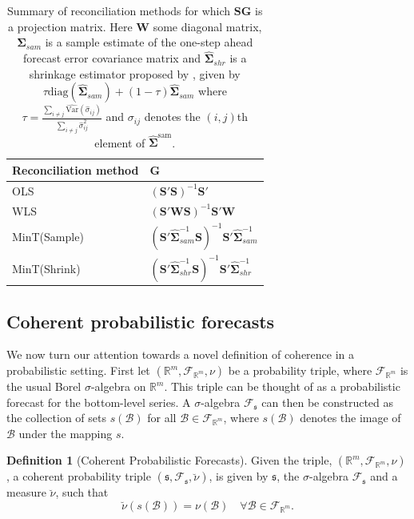 \documentclass[12pt]{article}
\def\var{\text{Var}}
\theoremstyle{definition}
\newtheorem{definition}{Definition}[section]
\begin{document}
\begin{table}[!t]
	\caption{Summary of reconciliation methods for which $\bm{S}\bm{G}$ is a projection matrix. Here $\bm{W}$ some diagonal matrix, $\bm{\hat\Sigma}_{sam}$ is a sample estimate of the one-step ahead forecast error covariance matrix and $\bm{\hat\Sigma}_{shr}$ is a shrinkage estimator proposed by \citet{Schafer2005}, given by $\tau \textrm{diag}(\bm{\hat\Sigma}_{sam})+(1-\tau)\bm{\hat\Sigma}_{sam}$  where $\tau = \frac{\sum_{i \neq j}\hat{\var}(\hat{\sigma}_{ij})}{\sum_{i \neq j}{\hat{\sigma}}^2_{ij}}$ and  $\sigma_{ij}$ denotes the $(i,j)$th element of $\hat{\bm{\Sigma}}^{\text{sam}}$.} \label{tab:ReconMethods}
	\centering
	\begin{tabular}{l@{\hskip 0.4in}l}
		\toprule
		\textbf{Reconciliation method} & \textbf{$\bm{G}$} \\
		\midrule
		OLS             & $(\bm{S}'\bm{S})^{-1}\bm{S}'$ \\
		WLS             & $(\bm{S}'\bm{W}\bm{S})^{-1}\bm{S}'\bm{W}$ \\
		MinT(Sample)    & $(\bm{S}'\bm{\hat\Sigma}_{sam}^{-1}\bm{S})^{-1}\bm{S}' \bm{\hat\Sigma}_{sam}^{-1}$  \\
		MinT(Shrink)    & $(\bm{S}'\bm{\hat\Sigma}_{shr}^{-1}\bm{S})^{-1}\bm{S}' \bm{\hat\Sigma}_{shr}^{-1}$  \\
		\bottomrule
	\end{tabular}
	\label{tab:recomethods}
\end{table}

\subsection{Coherent probabilistic forecasts}

We now turn our attention towards a novel definition of coherence in a probabilistic setting.  First let $(\mathbb{R}^m, \mathscr{F}_{\mathbb{R}^m}, \nu)$ be a probability triple, where $\mathscr{F}_{\mathbb{R}^m}$ is the usual Borel $\sigma$-algebra on $\mathbb{R}^m$. This triple can be thought of as a probabilistic forecast for the bottom-level series.  A $\sigma$-algebra $\mathscr{F}_{\mathfrak{s}}$ can then be constructed as the collection of sets $s(\mathcal{B})$ for all $\mathcal{B}\in \mathscr{F}_{\mathbb{R}^m}$, where $s(\mathcal{B})$ denotes the image of $\mathcal{B}$ under the mapping $s$.

\begin{definition}[Coherent Probabilistic Forecasts]\label{def:cohprob}
	Given the triple, $(\mathbb{R}^m, \mathscr{F}_{\mathbb{R}^m}, \nu)$, a coherent probability triple $(\mathfrak{s}, \mathscr{F}_{\mathfrak{s}}, \breve{\nu})$, is given by $\mathfrak{s}$, the $\sigma$-algebra $\mathscr{F}_{\mathfrak{s}}$ and a measure $\breve{\nu}$, such that
	\[
	\breve{\nu}(s(\mathcal{B})) = \nu(\mathcal{B}) \quad \forall \mathcal{B} \in \mathscr{F}_{\mathbb{R}^m}.
	\]
\end{definition}
\end{document}
